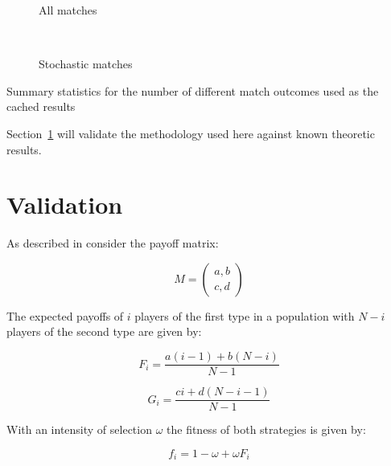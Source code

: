 \documentclass{article}
\begin{document}
\begin{table}[!hbtp]
    \centering
    \begin{subfigure}[t]{.5\textwidth}
        \centering
        
        \caption{All matches}
    \end{subfigure}%
    ~
    \begin{subfigure}[t]{.5\textwidth}
        \centering
        
        \caption{Stochastic matches}
    \end{subfigure}%
    \caption{Summary statistics for the number of different match outcomes used
    as the cached results}
    \label{tbl:number_of_stochastic_match_outcomes}
\end{table}

Section~\ref{sec:validation} will validate the methodology used here against
known theoretic results.

\section{Validation}\label{sec:validation}

As described in \cite{Nowak} consider the payoff matrix:

\begin{equation}\label{equ:payoff_matrix}
    M = \begin{pmatrix}
        a, b\\
        c, d
        \end{pmatrix}
\end{equation}

The expected payoffs of \(i\) players of the first type in a population with \(N
- i\) players of the second type are given by:

\begin{equation}\label{equ:expected_payoff_one}
    F_i = \frac{a(i - 1) + b(N - i)}{N - 1}
\end{equation}

\begin{equation}\label{equ:expected_payoff_two}
    G_i = \frac{ci + d(N - i - 1)}{N - 1}
\end{equation}

With an intensity of selection \(\omega\) the fitness of both strategies is
given by:

\begin{equation}\label{equ:expected_payoff_one}
    f_i = 1 - \omega + \omega F_i
\end{equation}
\end{document}
